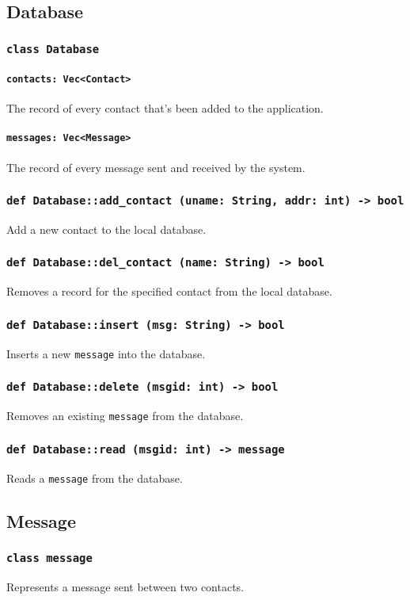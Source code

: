 \documentclass[]{article}
\begin{document}
\subsection{Database}
\subsubsection{\texttt{class Database}}
\paragraph{\texttt{contacts: Vec<Contact>}} The record of every contact that's been added to the application. 
\paragraph{\texttt{messages: Vec<Message>}} The record of every message sent and received by the system.
\subsubsection{\texttt{def Database::add\_contact (uname: String, addr: int) -> bool}}
Add a new contact to the local database.
\subsubsection{\texttt{def Database::del\_contact (name: String) -> bool}}
Removes a record for the specified contact from the local database.
\subsubsection{\texttt{def Database::insert (msg: String) -> bool}}
Inserts a new \verb!message! into the database.
\subsubsection{\texttt{def Database::delete (msgid: int) -> bool}}
Removes an existing \verb!message! from the database.
\subsubsection{\texttt{def Database::read (msgid: int) -> message}}
Reads a \verb!message! from the database.

\subsection{Message}
\subsubsection{\texttt{class message}}
Represents a message sent between two contacts.
\end{document}

